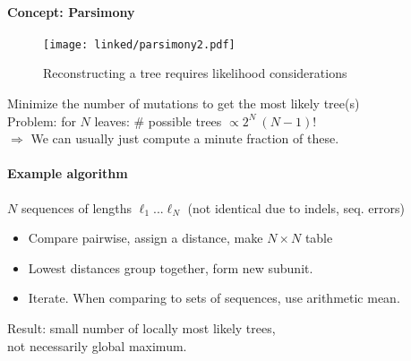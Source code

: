\documentclass{beamer}
\begin{document}
\begin{darkframes}
\begin{frame}{\secname}
\begin{itemize}
      \end{itemize}
    \end{frame}



    \begin{frame}{\secname}

      \framesubtitle{Concept: Parsimony}

      \begin{figure}
        \texttt{[image: linked/parsimony2.pdf]}
        \caption{\footnotesize Reconstructing a tree requires likelihood considerations}
      \end{figure}
      \footnotesize

      Minimize the number of mutations to get the most likely tree(s)\\[1mm]

      Problem: for $N$ leaves: \hspace*{.5cm}\# possible trees $\propto 2^N\ (N-1) !$\\[1mm]

      $\Rightarrow$ We can usually just compute a minute fraction of these.

    \end{frame}


    \begin{frame}{\secname}
      \framesubtitle{Example algorithm}

      \vfill
      $N$ sequences of lengths $\ell_1 ... \ell_N$ \small \hspace*{.3cm}(not identical due to indels, seq. errors)
      \begin{itemize}
        \item Compare pairwise, assign a distance, make $N \times N$ table
        \item Lowest distances group together, form new subunit.
        \item Iterate. When comparing to sets of sequences, use arithmetic mean.
      \end{itemize}

      Result: small number of locally most likely trees,\\
      \hspace*{1.06cm}not necessarily global maximum.


\end{frame}
\end{darkframes}
\end{document}
